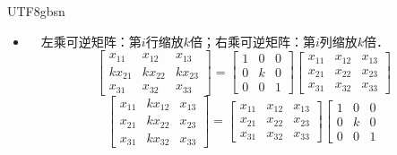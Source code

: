 \documentclass[12pt]{article}
\begin{document}
\begin{CJK}{UTF8}{gbsn}
\begin{itemize}
\begin{equation}
\begin{array}{ccc}
x_{23} & x_{22} & x_{21}\\
x_{33} & x_{32} & x_{31}
\end{array}
\right]
=
\left[
\begin{array}{ccc}
x_{11} & x_{12} & x_{13}\\
x_{21} & x_{22} & x_{23}\\
x_{31} & x_{32} & x_{33}
\end{array}
\right]
\left[
\begin{array}{ccc}
0 & 0 & 1\\
0 & 1 & 0\\
1 & 0 & 0
\end{array}
\right]
\end{equation}
\item[\textbf{行/列缩放}]　左乘可逆矩阵：第$i$行缩放$k$倍；右乘可逆矩阵：第$i$列缩放$k$倍．
\begin{equation}
\left[
\begin{array}{ccc}
x_{11} & x_{12} & x_{13}\\
kx_{21} & kx_{22} & kx_{23}\\
x_{31} & x_{32} & x_{33}
\end{array}
\right]
=
\left[
\begin{array}{ccc}
1 & 0 & 0\\
0 & k & 0\\
0 & 0 & 1
\end{array}
\right]
\left[
\begin{array}{ccc}
x_{11} & x_{12} & x_{13}\\
x_{21} & x_{22} & x_{23}\\
x_{31} & x_{32} & x_{33}
\end{array}
\right]
\end{equation}
\begin{equation}
\left[
\begin{array}{ccc}
x_{11} & kx_{12} & x_{13}\\
x_{21} & kx_{22} & x_{23}\\
x_{31} & kx_{32} & x_{33}
\end{array}
\right]
=
\left[
\begin{array}{ccc}
x_{11} & x_{12} & x_{13}\\
x_{21} & x_{22} & x_{23}\\
x_{31} & x_{32} & x_{33}
\end{array}
\right]
\left[
\begin{array}{ccc}
1 & 0 & 0\\
0 & k & 0\\
0 & 0 & 1

\end{array}
\end{equation}
\end{itemize}
\end{CJK}
\end{document}
